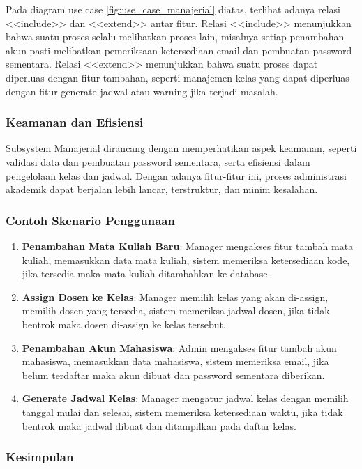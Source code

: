 \documentclass[a4paper,oneside,11pt]{book}
\begin{document}
Pada diagram use case \ref{fig:use_case_manajerial} diatas, terlihat adanya relasi <<include>> dan <<extend>> antar fitur. Relasi <<include>> menunjukkan bahwa suatu proses selalu melibatkan proses lain, misalnya setiap penambahan akun pasti melibatkan pemeriksaan ketersediaan email dan pembuatan password sementara. Relasi <<extend>> menunjukkan bahwa suatu proses dapat diperluas dengan fitur tambahan, seperti manajemen kelas yang dapat diperluas dengan fitur generate jadwal atau warning jika terjadi masalah.

\subsubsection{Keamanan dan Efisiensi}

Subsystem Manajerial dirancang dengan memperhatikan aspek keamanan, seperti validasi data dan pembuatan password sementara, serta efisiensi dalam pengelolaan kelas dan jadwal. Dengan adanya fitur-fitur ini, proses administrasi akademik dapat berjalan lebih lancar, terstruktur, dan minim kesalahan.

\subsubsection{Contoh Skenario Penggunaan}

\begin{enumerate}
  \item \textbf{Penambahan Mata Kuliah Baru}: Manager mengakses fitur tambah mata kuliah, memasukkan data mata kuliah, sistem memeriksa ketersediaan kode, jika tersedia maka mata kuliah ditambahkan ke database.
  \item \textbf{Assign Dosen ke Kelas}: Manager memilih kelas yang akan di-assign, memilih dosen yang tersedia, sistem memeriksa jadwal dosen, jika tidak bentrok maka dosen di-assign ke kelas tersebut.
  \item \textbf{Penambahan Akun Mahasiswa}: Admin mengakses fitur tambah akun mahasiswa, memasukkan data mahasiswa, sistem memeriksa email, jika belum terdaftar maka akun dibuat dan password sementara diberikan.
  \item \textbf{Generate Jadwal Kelas}: Manager mengatur jadwal kelas dengan memilih tanggal mulai dan selesai, sistem memeriksa ketersediaan waktu, jika tidak bentrok maka jadwal dibuat dan ditampilkan pada daftar kelas.
\end{enumerate}

\subsubsection{Kesimpulan}
\end{document}
